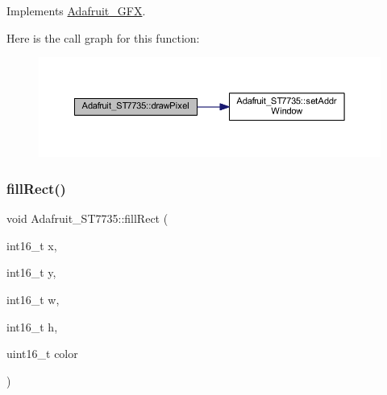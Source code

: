 Implements \hyperlink{class_adafruit___g_f_x_ab7fbf72885c873266f9c7eb53b5c8896}{Adafruit\+\_\+\+G\+FX}.

Here is the call graph for this function\+:\nopagebreak
\begin{figure}[H]
\begin{center}
\leavevmode
\includegraphics[width=350pt]{class_adafruit___s_t7735_af22a5ba7282850793f4943ba2d682af0_cgraph}
\end{center}
\end{figure}
\mbox{\label{class_adafruit___s_t7735_a3556265c5b017cd2cdceb1f34e9bc421}} 
\subsubsection{\texorpdfstring{fill\+Rect()}{fillRect()}}
{\footnotesize\ttfamily void Adafruit\+\_\+\+S\+T7735\+::fill\+Rect (\begin{DoxyParamCaption}\item[{int16\+\_\+t}]{x,  }\item[{int16\+\_\+t}]{y,  }\item[{int16\+\_\+t}]{w,  }\item[{int16\+\_\+t}]{h,  }\item[{uint16\+\_\+t}]{color }\end{DoxyParamCaption})}


